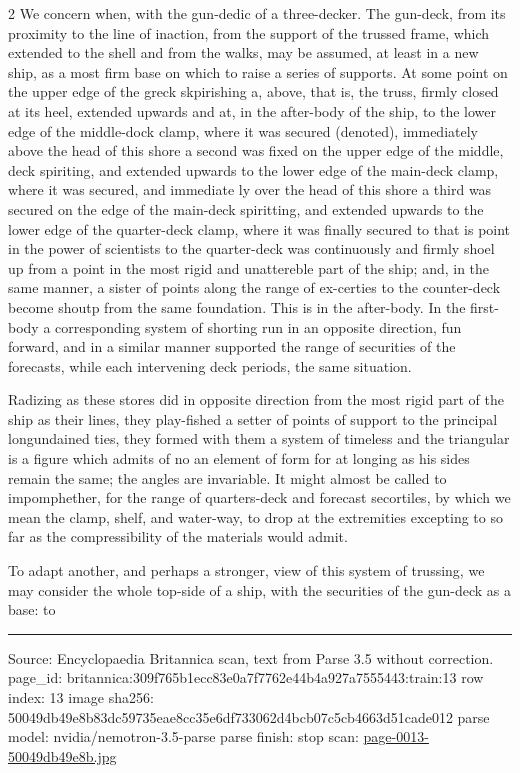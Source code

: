 \documentclass[10pt]{article}
\begin{document}
\begin{multicols}{2}
We concern when, with the gun-dedic of a three-decker. The gun-deck, from its proximity to the line of inaction, from the support of the trussed frame, which extended to the shell and from the walks, may be assumed, at least in a new ship, as a most firm base on which to raise a series of supports. At some point on the upper edge of the greck skpirishing a, above, that is, the truss, firmly closed at its heel, extended upwards and at, in the after-body of the ship, to the lower edge of the middle-dock clamp, where it was secured (denoted), immediately above the head of this shore a second was fixed on the upper edge of the middle, deck spiriting, and extended upwards to the lower edge of the main-deck clamp, where it was secured, and immediate ly over the head of this shore a third was secured on the edge of the main-deck spiritting, and extended upwards to the lower edge of the quarter-deck clamp, where it was finally secured to that is point in the power of scientists to the quarter-deck was continuously and firmly shoel up from a point in the most rigid and unattereble part of the ship; and, in the same manner, a sister of points along the range of ex-certies to the counter-deck become shoutp from the same foundation. This is in the after-body. In the first-body a corresponding system of shorting run in an opposite direction, fun forward, and in a similar manner supported the range of securities of the forecasts, while each intervening deck periods, the same situation.

Radizing as these stores did in opposite direction from the most rigid part of the ship as their lines, they play-fished a setter of points of support to the principal longundained ties, they formed with them a system of timeless and the triangular is a figure which admits of no an element of form for at longing as his sides remain the same; the angles are invariable. It might almost be called to impomphether, for the range of quarters-deck and forecast secortiles, by which we mean the clamp, shelf, and water-way, to drop at the extremities excepting to so far as the compressibility of the materials would admit.

To adapt another, and perhaps a stronger, view of this system of trussing, we may consider the whole top-side of a ship, with the securities of the gun-deck as a base: to

\end{multicols}
\vfill\par\noindent\rule{\linewidth}{0.4pt}\par
{\scriptsize\color{gray}\noindent Source: Encyclopaedia Britannica scan, text from Parse 3.5 without correction. page\_id: britannica:309f765b1ecc83e0a7f7762e44b4a927a7555443:train:13 \quad row index: 13 \quad image sha256: 50049db49e8b83dc59735eae8cc35e6df733062d4bcb07c5cb4663d51cade012 \quad parse model: nvidia/nemotron-3.5-parse \quad parse finish: stop \quad scan: \href{../scans/page-0013-50049db49e8b.jpg}{page-0013-50049db49e8b.jpg}\par}
\end{document}
